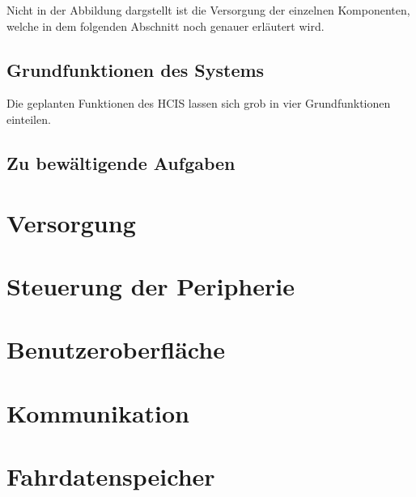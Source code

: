 Nicht in der Abbildung dargstellt ist die Versorgung der einzelnen Komponenten, welche in dem folgenden Abschnitt noch genauer erläutert wird.
\subsection{Grundfunktionen des Systems}
Die geplanten Funktionen des HCIS lassen sich grob in vier Grundfunktionen einteilen.

\subsection{Zu bewältigende Aufgaben}


\section{Versorgung}
\section{Steuerung der Peripherie}
\section{Benutzeroberfläche}
\section{Kommunikation}
\section{Fahrdatenspeicher}